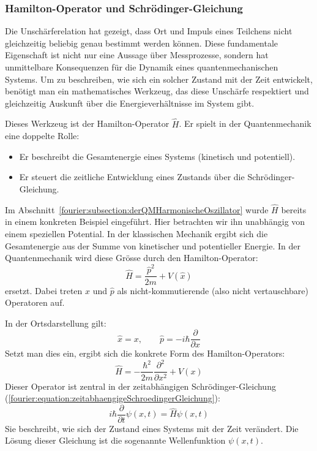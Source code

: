 	\subsubsection{Hamilton-Operator und Schrödinger-Gleichung%
	\label{fourier:subsubsection:hamiltonOperatorUndSchroedinger}}
		Die Unschärferelation hat gezeigt, dass Ort und Impuls eines Teilchens nicht gleichzeitig beliebig genau bestimmt werden können.
		Diese fundamentale Eigenschaft ist nicht nur eine Aussage über Messprozesse,
		sondern hat unmittelbare Konsequenzen für die Dynamik eines quantenmechanischen Systems.
		Um zu beschreiben, wie sich ein solcher Zustand mit der Zeit entwickelt,
		benötigt man ein mathematisches Werkzeug, das diese Unschärfe respektiert
		und gleichzeitig Auskunft über die Energieverhältnisse im System gibt.
		
		Dieses Werkzeug ist der Hamilton-Operator \( \hat{H} \).
		Er spielt in der Quantenmechanik eine doppelte Rolle:
		\begin{itemize}
		\item Er beschreibt die Gesamtenergie eines Systems (kinetisch und potentiell).
		\item Er steuert die zeitliche Entwicklung eines Zustands über die Schrödinger-Gleichung.
		\end{itemize}
		Im Abschnitt~\ref{fourier:subsection:derQMHarmonischeOszillator} wurde $\hat{H}$ bereits in einem konkreten Beispiel eingeführt.
		Hier betrachten wir ihn unabhängig von einem speziellen Potential.
		In der klassischen Mechanik ergibt sich die Gesamtenergie aus der Summe von kinetischer und potentieller Energie.
		In der Quantenmechanik wird diese Grösse durch den Hamilton-Operator:
		\begin{equation}\label{fourier:equation:HamiltonOperatorQM}
			\hat{H} = \frac{\hat{p}^2}{2m} + V(\hat{x})
		\end{equation}
		ersetzt.
		Dabei treten $\hat{x}$ und $\hat{p}$ als nicht-kommutierende (also nicht vertauschbare) Operatoren auf.
		
		In der Ortsdarstellung gilt:
		\begin{equation}
			\hat{x} = x, \qquad \hat{p} = -i\hbar \frac{\partial}{\partial x}
		\end{equation}
		Setzt man dies ein, ergibt sich die konkrete Form des Hamilton-Operators:
		\begin{equation}
			\hat{H} = -\frac{\hbar^2}{2m} \frac{\partial^2}{\partial x^2} + V(x)
		\end{equation}
		Dieser Operator ist zentral in der zeitabhängigen Schrödinger-Gleichung (\ref{fourier:equation:zeitabhaengigeSchroedingerGleichung}):
		\begin{equation}
			i\hbar \frac{\partial}{\partial t} \psi(x,t) = \hat{H} \psi(x,t)
		\end{equation}
		Sie beschreibt, wie sich der Zustand eines Systems mit der Zeit verändert.
		Die Lösung dieser Gleichung ist die sogenannte Wellenfunktion \( \psi(x,t) \).

